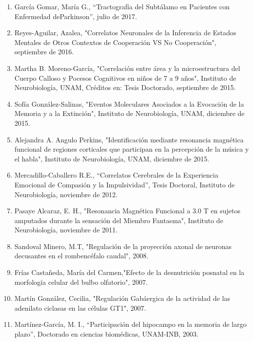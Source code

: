 \begin{enumerate}
\item  García Gomar, María G., “Tractografía del Subtálamo en Pacientes con Enfermedad deParkinson”, julio de 2017.

\item  Reyes-Aguilar, Azalea, "Correlatos Neuronales de la Inferencia de Estados Mentales de Otros Contextos de Cooperación VS 
No 
Cooperación", septiembre de 2016.

\item  Martha B. Moreno-García, "Correlación entre área y la microestructura del Cuerpo Calloso y Pocesos Cognitivos en niños 
de 7 
a 9 años", Instituto de Neurobiología, UNAM, Créditos en: Tesis Doctorado, septiembre de 2015.

\item  Sofía González-Salinas, "Eventos Moleculares Asociados a la Evocación de la Memoria y a la Extinción", Instituto de 
Neurobiología, UNAM, diciembre de 2015.

\item  Alejandra A. Angulo Perkins, "Identificación mediante resonancia magnética funcional de regiones corticales que 
participan 
en la percepción de la música y el habla", Instituto de Neurobiología, UNAM, diciembre de 2015.

\item  Mercadillo-Caballero R.E., “Correlatos Cerebrales de la Experiencia Emocional de Compasión y la Impulsividad”, Tesis 
Doctoral, Instituto de Neurobiología, noviembre de 2012.

\item  Pasaye Alcaraz, E. H., "Resonancia Magnética Funcional a 3.0 T en sujetos amputados durante la sensación del Miembro 
Fantasma", Instituto de Neurobiología, noviembre de 2011.

\item  Sandoval Minero, M.T, "Regulación de la proyección axonal de neuronas decusantes en el rombencéfalo caudal", 2008.

\item  Frías Castañeda, María del Carmen,"Efecto de la desnutrición posnatal en la morfología celular del bulbo olfatorio",  2007.

\item  Martín González, Cecilia, "Regulación Gabáergica de la actividad de las adenilato ciclasas en las células GT1", 2007.

\item  Martínez-García, M. I., “Participación del hipocampo en la memoria de largo plazo”, Doctorado en ciencias biomédicas, 
UNAM-INB, 2003.

\end{enumerate}

